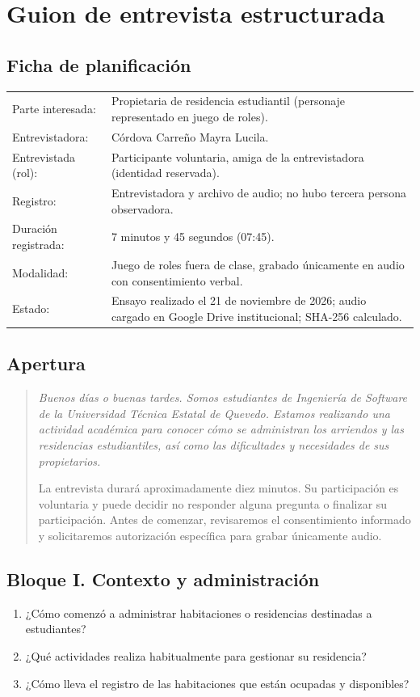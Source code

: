 \documentclass[12pt,a4paper]{article}
\begin{document}
\section{Guion de entrevista estructurada}
\subsection{Ficha de planificación}
\begin{tabularx}{\linewidth}{@{}p{4.4cm}X@{}}
Parte interesada: & Propietaria de residencia estudiantil (personaje representado en juego de roles).\\
Entrevistadora: & Córdova Carreño Mayra Lucila.\\
Entrevistada (rol): & Participante voluntaria, amiga de la entrevistadora (identidad reservada).\\
Registro: & Entrevistadora y archivo de audio; no hubo tercera persona observadora.\\
Duración registrada: & 7 minutos y 45 segundos (07:45).\\
Modalidad: & Juego de roles fuera de clase, grabado únicamente en audio con consentimiento verbal.\\
Estado: & Ensayo realizado el 21 de noviembre de 2026; audio cargado en Google Drive institucional; SHA-256 calculado.\\
\end{tabularx}

\subsection{Apertura}
\begin{quote}\itshape\color{azul}
Buenos días o buenas tardes. Somos estudiantes de Ingeniería de Software de la Universidad Técnica Estatal de Quevedo. Estamos realizando una actividad académica para conocer cómo se administran los arriendos y las residencias estudiantiles, así como las dificultades y necesidades de sus propietarios.

La entrevista durará aproximadamente diez minutos. Su participación es voluntaria y puede decidir no responder alguna pregunta o finalizar su participación. Antes de comenzar, revisaremos el consentimiento informado y solicitaremos autorización específica para grabar únicamente audio.
\end{quote}

\subsection{Bloque I. Contexto y administración}
\begin{enumerate}[label=\textbf{P\arabic*.},leftmargin=1.5cm]
\item ¿Cómo comenzó a administrar habitaciones o residencias destinadas a estudiantes?
\item ¿Qué actividades realiza habitualmente para gestionar su residencia?
\item ¿Cómo lleva el registro de las habitaciones que están ocupadas y disponibles?
\end{enumerate}
\end{document}
